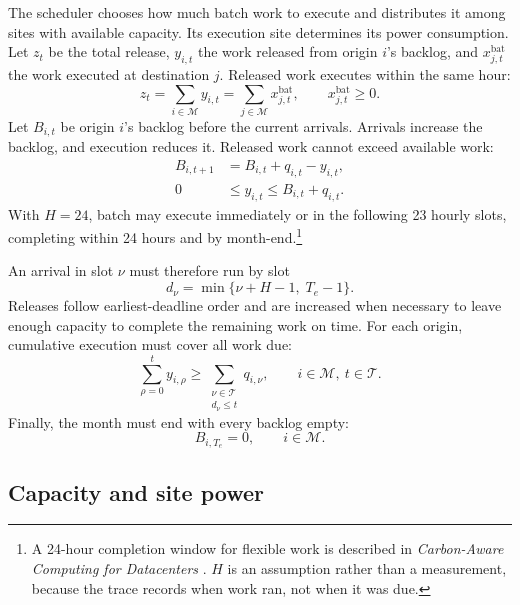 \documentclass[conference]{IEEEtran}
\begin{document}
The scheduler chooses how much batch work to execute and distributes it
among sites with available capacity. Its execution site determines its
power consumption. Let \(z_t\) be the total release, \(y_{i,t}\) the work
released from origin \(i\)'s backlog, and \(x^{\mathrm{bat}}_{j,t}\) the work
executed at destination \(j\). Released work executes within the same hour:
\begin{equation}
  z_t
  =
  \sum_{i\in\mathcal M}y_{i,t}
  =
  \sum_{j\in\mathcal M}x^{\mathrm{bat}}_{j,t},
  \qquad
  x^{\mathrm{bat}}_{j,t}\geq0.
  \label{eq:batch-total}
\end{equation}
Let \(B_{i,t}\) be origin \(i\)'s backlog before the current arrivals.
Arrivals increase the backlog, and execution reduces it. Released work
cannot exceed available work:
\begin{align}
  B_{i,t+1}
  &=
  B_{i,t}+q_{i,t}-y_{i,t},
  \label{eq:queue-balance}\\
  0
  &\leq y_{i,t}\leq B_{i,t}+q_{i,t}.
  \label{eq:queue-availability}
\end{align}
With \(H=24\), batch may execute immediately or in the following 23 hourly
slots, completing within 24 hours and by month-end.\footnote{A 24-hour
completion window for flexible work is described in \emph{Carbon-Aware
Computing for Datacenters} \cite{radovanovic2021carbonaware}. \(H\) is an assumption rather than a
measurement, because the trace records when work ran, not when it was due.}

An arrival in slot \(\nu\) must therefore run by slot
\begin{equation}
  d_{\nu}
  =
  \min\{\nu+H-1,\;T_e-1\}.
  \label{eq:batch-deadline}
\end{equation}
Releases follow earliest-deadline order and are increased when necessary to
leave enough capacity to complete the remaining work on time. For each
origin, cumulative execution must cover all work due:
\begin{equation}
  \sum_{\rho=0}^{t}y_{i,\rho}
  \geq
  \sum_{\substack{\nu\in\mathcal T\\d_{\nu}\leq t}}q_{i,\nu},
  \qquad i\in\mathcal M,\ t\in\mathcal T.
  \label{eq:deadline-feasibility}
\end{equation}
Finally, the month must end with every backlog empty:
\begin{equation}
  B_{i,T_e}=0,
  \qquad i\in\mathcal M.
  \label{eq:terminal-queue}
\end{equation}

\subsection{Capacity and site power}
\label{subsec:problem-feasibility}
\end{document}
